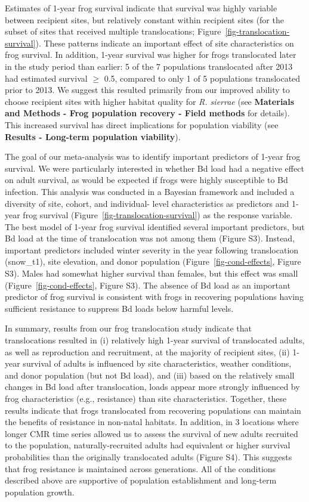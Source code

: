 \documentclass[9pt,twocolumn,twoside,lineno]{pnas-new}
\begin{document}
Estimates of 1-year frog survival indicate that survival was highly
variable between recipient sites, but relatively constant within
recipient sites (for the subset of sites that received multiple
translocations; Figure~\ref{fig-translocation-survival}). These patterns
indicate an important effect of site characteristics on frog survival.
In addition, 1-year survival was higher for frogs translocated later in
the study period than earlier: 5 of the 7 populations translocated after
2013 had estimated survival \(\ge\) 0.5, compared to only 1 of 5
populations translocated prior to 2013. We suggest this resulted
primarily from our improved ability to choose recipient sites with
higher habitat quality for \emph{R. sierrae} (see \textbf{Materials and
Methods - Frog population recovery - Field methods} for details). This
increased survival has direct implications for population viability (see
\textbf{Results - Long-term population viability}).

The goal of our meta-analysis was to identify important predictors of
1-year frog survival. We were particularly interested in whether Bd load
had a negative effect on adult survival, as would be expected if frogs
were highly susceptible to Bd infection. This analysis was conducted in
a Bayesian framework and included a diversity of site, cohort, and
individual- level characteristics as predictors and 1-year frog survival
(Figure~\ref{fig-translocation-survival}) as the response variable. The
best model of 1-year frog survival identified several important
predictors, but Bd load at the time of translocation was not among them
(Figure S3). Instead, important predictors
included winter severity in the year following translocation (snow\_t1),
site elevation, and donor population (Figure~\ref{fig-cond-effects},
Figure S3). Males had somewhat higher
survival than females, but this effect was small
(Figure~\ref{fig-cond-effects}, Figure S3).
The absence of Bd load as an important predictor of frog survival is
consistent with frogs in recovering populations having sufficient
resistance to suppress Bd loads below harmful levels.

In summary, results from our frog translocation study indicate that
translocations resulted in (i) relatively high 1-year survival of
translocated adults, as well as reproduction and recruitment, at the
majority of recipient sites, (ii) 1-year survival of adults is
influenced by site characteristics, weather conditions, and donor
population (but not Bd load), and (iii) based on the relatively small
changes in Bd load after translocation, loads appear more strongly
influenced by frog characteristics (e.g., resistance) than site
characteristics. Together, these results indicate that frogs
translocated from recovering populations can maintain the benefits of
resistance in non-natal habitats. In addition, in 3 locations where
longer CMR time series allowed us to assess the survival of new adults
recruited to the population, naturally-recruited adults had equivalent
or higher survival probabilities than the originally translocated adults
(Figure S4). This suggests that frog
resistance is maintained across generations. All of the conditions
described above are supportive of population establishment and long-term
population growth.
\end{document}
